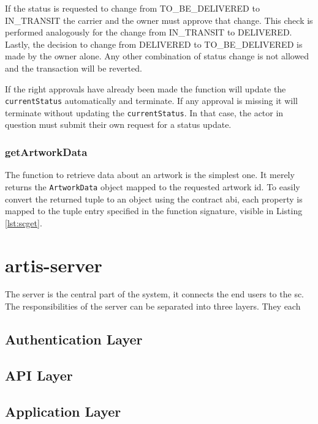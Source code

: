 If the status is requested to change from TO\_BE\_DELIVERED to IN\_TRANSIT the carrier and the owner must approve that change. This check is performed analogously for the change from IN\_TRANSIT to DELIVERED. Lastly, the decision to change from DELIVERED to TO\_BE\_DELIVERED is made by the owner alone. Any other combination of status change is not allowed and the transaction will be reverted.

If the right approvals have already been made the function will update the \texttt{currentStatus} automatically and terminate. If any approval is missing it will terminate without updating the \texttt{currentStatus}. In that case, the actor in question must submit their own request for a status update.

\subsubsection{getArtworkData}
The function to retrieve data about an artwork is the simplest one. It merely returns the \texttt{ArtworkData} object mapped to the requested artwork id. To easily convert the returned tuple to an object using the contract \gls{abi}, each property is mapped to the tuple entry specified in the function signature, visible in Listing \ref{lst:scget}.



\clearpage
\section{artis-server}
The server is the central part of the system, it connects the end users to the \gls{sc}. The responsibilities of the server can be separated into three layers. They each 

\subsection{Authentication Layer}
\subsection{API Layer}
\subsection{Application Layer}


